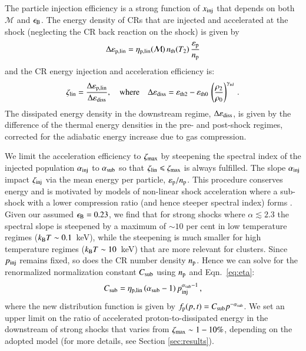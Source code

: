 \documentclass[fleqn,usenatbib,useAMS]{mnras}
\newcommand\eb{\epsilon_\rmn{B}}
\newcommand{\p}{\rmn{p}}
\newcommand{\kB}{k_{\rmn{B}}}
\newcommand{\eps}{\varepsilon}
\begin{document}
The particle injection efficiency is a strong function of
$x_{\mathrm{inj}}$ that depends on both $\mathcal{M}$ and $\eb$. The
energy density of CRs that are injected and accelerated at the shock
(neglecting the CR back reaction on the shock) is given by
\begin{equation}
\label{eq:CR_energy} 
  \Delta\eps_\rmn{p,lin} =
  \eta_\rmn{p,lin}(\mathcal{M})\,n_\rmn{th}(T_2)
  \,\frac{\eps_\p}{n_\p}
\end{equation}
and the CR energy injection and acceleration efficiency is:
\begin{equation}
  \zeta_\rmn{lin} =
  \frac{\Delta\eps_\rmn{p,lin}}{\Delta\eps_\rmn{diss}},
   \quad\mbox{where}\quad
  \Delta\eps_\rmn{diss} = \eps_\rmn{th2} - \eps_\rmn{th0}\,\left(\frac{\rho_2}{\rho_0}\right)^{\gamma_\rmn{ad}}\,.
\label{eqn:energy_frac}  
\end{equation}
The dissipated energy density in the downstream regime,
$\Delta\eps_\rmn{diss}$, is given by the difference of the thermal
energy densities in the pre- and post-shock regimes, corrected for the
adiabatic energy increase due to gas compression.

We limit the acceleration efficiency to $\zeta_{\mathrm{max}}$ by
steepening the spectral index of the injected population
$\alpha_{\mathrm{inj}}$ to $\alpha_{\mathrm{sub}}$ so that $\zeta_{\mathrm{lin}}
\leqslant \zeta_{\mathrm{max}}$ is always fulfilled. The slope
$\alpha_{\mathrm{inj}}$ impact $\zeta_{\mathrm{inj}}$ via the mean energy per
particle, $\eps_\rmn{p}/n_\rmn{p}$. This
procedure conserves energy and is motivated by models of non-linear
shock acceleration where a sub-shock with a lower compression ratio
(and hence steeper spectral index) forms
\citep[e.g.,][]{2000ApJ...540..292E}. Given our assumed $\eb=0.23$, we
find that for strong shocks where $\alpha \lesssim 2.3$ the spectral
slope is steepened by a maximum of $\sim 10$ per cent in low
temperature regimes ($\kB T\sim 0.1$~keV), while the steepening is much
smaller for high temperature regimes ($\kB T\sim 10$~keV) that are more
relevant for clusters. Since $p_{\mathrm{inj}}$ remains fixed, so does the
CR number density $n_{\mathrm{p}}$. Hence we can solve for the
renormalized normalization constant $C_{\mathrm{sub}}$ using $n_{\mathrm{p}}$
and Eqn.~\ref{eq:eta}:
\begin{equation}
  \label{eq:Cp_sub}
  C_{\mathrm{sub}}=\eta_{\mathrm{p,lin}}\,(\alpha_{\mathrm{sub}}-1)\,p_{\mathrm{inj}}^{\alpha_{\mathrm{sub}}-1}\,,
\end{equation}
where the new distribution function is given by $f_\p(p,t)= C_\rmn{sub}
p^{-\alpha_\rmn{sub}}$. We set an upper limit on the ratio of
accelerated proton-to-dissipated energy in the downstream of strong
shocks that varies from $\zeta_{\mathrm{max}} \sim 1-10\%$, depending on
the adopted model (for more details, see Section \ref{sec:results}).
\end{document}
